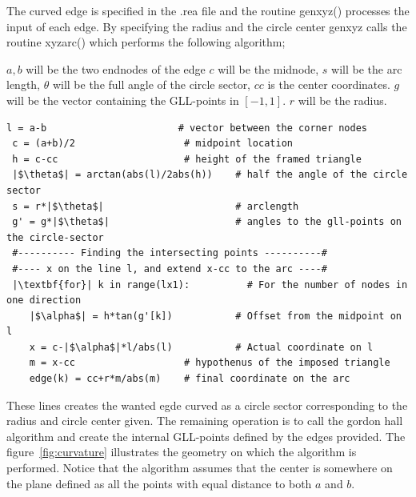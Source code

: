 The curved edge is specified in the .rea file and the routine genxyz() processes the input of each edge. 
By specifying the radius and the circle center genxyz calls the routine xyzarc() which performs the following algorithm;

    $a,b$ will be the two endnodes of the edge 
    $c$ will be the midnode, $s$ will be the arc length, $\theta$ will be the full angle of the circle sector, $cc$ is the center coordinates.
    $g$ will be the vector containing the GLL-points in $[-1,1]$. $r$ will be the radius.

\begingroup
\fontsize{12pt}{14pt}
\begin{lstlisting}[escapechar=|]
 l = a-b                       # vector between the corner nodes
 c = (a+b)/2                   # midpoint location
 h = c-cc                      # height of the framed triangle
 |$\theta$| = arctan(abs(l)/2abs(h))    # half the angle of the circle sector
 s = r*|$\theta$|                       # arclength
 g' = g*|$\theta$|                      # angles to the gll-points on the circle-sector
 #---------- Finding the intersecting points ----------#
 #---- x on the line l, and extend x-cc to the arc ----#
 |\textbf{for}| k in range(lx1):          # For the number of nodes in one direction
    |$\alpha$| = h*tan(g'[k])           # Offset from the midpoint on l
    x = c-|$\alpha$|*l/abs(l)           # Actual coordinate on l
    m = x-cc                   # hypothenus of the imposed triangle
    edge(k) = cc+r*m/abs(m)    # final coordinate on the arc
\end{lstlisting}
\endgroup
These lines creates the wanted egde curved as a circle sector corresponding to the radius and circle center given.
The remaining operation is to call the gordon hall algorithm and create the internal GLL-points defined by the edges 
provided. The figure~\ref{fig:curvature} illustrates the geometry on which the algorithm is performed.
Notice that the algorithm assumes that the center is somewhere on the plane defined as all the 
points with equal distance to both $a$ and $b$.


